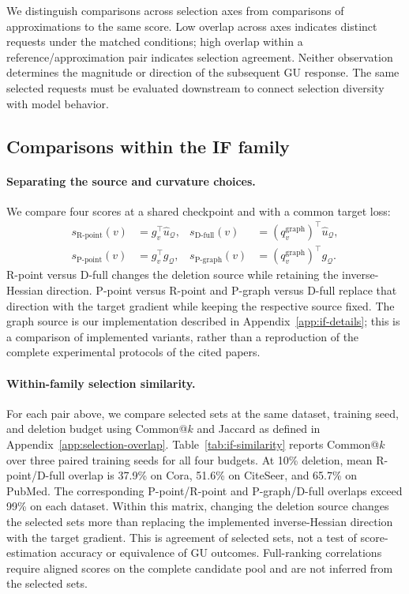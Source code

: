 We distinguish comparisons across selection axes from comparisons of approximations to the same score. Low overlap across axes indicates distinct requests under the matched conditions; high overlap within a reference/approximation pair indicates selection agreement. Neither observation determines the magnitude or direction of the subsequent GU response. The same selected requests must be evaluated downstream to connect selection diversity with model behavior.

\subsection{Comparisons within the IF family}
\label{app:if-comparisons}

\paragraph{Separating the source and curvature choices.}
We compare four scores at a shared checkpoint and with a common target loss:
\begin{equation}
\begin{aligned}
s_{\mathrm{R\text{-}point}}(v)&=g_v^\top\widehat u_{\mathcal Q},
&s_{\mathrm{D\text{-}full}}(v)&=(q_v^{\mathrm{graph}})^\top\widehat u_{\mathcal Q},\\
s_{\mathrm{P\text{-}point}}(v)&=g_v^\top g_{\mathcal Q},
&s_{\mathrm{P\text{-}graph}}(v)&=(q_v^{\mathrm{graph}})^\top g_{\mathcal Q}.
\end{aligned}
\end{equation}
R-point versus D-full changes the deletion source while retaining the inverse-Hessian direction. P-point versus R-point and P-graph versus D-full replace that direction with the target gradient while keeping the respective source fixed. The graph source is our implementation described in Appendix~\ref{app:if-details}; this is a comparison of implemented variants, rather than a reproduction of the complete experimental protocols of the cited papers.

\paragraph{Within-family selection similarity.}
For each pair above, we compare selected sets at the same dataset, training seed, and deletion budget using Common@$k$ and Jaccard as defined in Appendix~\ref{app:selection-overlap}. Table~\ref{tab:if-similarity} reports Common@$k$ over three paired training seeds for all four budgets. At 10\% deletion, mean R-point/D-full overlap is 37.9\% on Cora, 51.6\% on CiteSeer, and 65.7\% on PubMed. The corresponding P-point/R-point and P-graph/D-full overlaps exceed 99\% on each dataset. Within this matrix, changing the deletion source changes the selected sets more than replacing the implemented inverse-Hessian direction with the target gradient. This is agreement of selected sets, not a test of score-estimation accuracy or equivalence of GU outcomes. Full-ranking correlations require aligned scores on the complete candidate pool and are not inferred from the selected sets.

